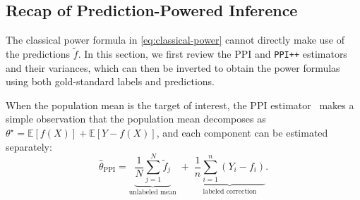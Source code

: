 \documentclass[12pt]{article}
\newcommand{\E}{\mathbb{E}}
\newcommand{\wh}{\widehat}
\newcommand{\wt}{\widetilde}
\begin{document}
\subsection{Recap of Prediction-Powered Inference}
\label{subsec:ppi-power}\label{sec:ppi-vanilla}
The classical power formula in \eqref{eq:classical-power} cannot directly make use of the predictions $\tilde{f}$.  In this section, we first review the PPI and \texttt{PPI++} estimators and their variances, which can then be inverted to obtain the power formulas using both gold-standard labels and predictions.

When the population mean is the target of interest, the PPI estimator~\citep{angelopoulos2023prediction} makes a simple observation that the population mean decomposes as $\theta^\star = \E[f(X)] + \E[Y - f(X)]$, and each component can be estimated separately:
\begin{equation}\label{eq:ppi-estimator}
  \wh{\theta}_{\mathrm{PPI}}
  = \underbrace{\frac{1}{N}\sum_{j=1}^N \wt{f}_j}_{\text{unlabeled mean}}
  \;+\;
  \underbrace{\frac{1}{n}\sum_{i=1}^n (Y_i - f_i)}_{\text{labeled correction}}.
\end{equation}
\end{document}
